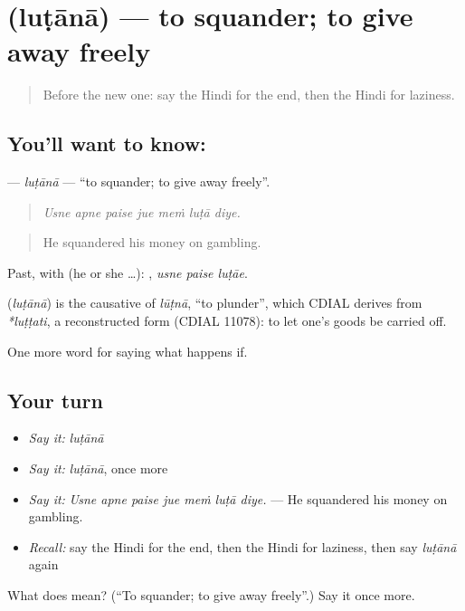 \section[\texorpdfstring{\hi{लुटाना} (luṭānā)}{लुटाना (luṭānā)}]{ (luṭānā) — to squander; to give away freely}

\label{lesson:HI-C548-lutana}



\begin{quote}
Before the new one: say the Hindi for the end, then the Hindi for laziness.
\end{quote}

\subsection*{You'll want to know: }
\textbf{} — \emph{luṭānā} — \textquotedblleft{}to squander; to give away freely\textquotedblright{}.

\begin{quote}
      
\end{quote}

\begin{quote}
\emph{Usne apne paise jue meṁ luṭā diye.}
\end{quote}

\begin{quote}
He squandered his money on gambling.
\end{quote}

Past, with  (he or she …):   , \emph{usne paise luṭāe}.

\begin{cousinweb}
\textbf{} (\emph{luṭānā}) is the causative of \emph{lūṭnā}, \textquotedblleft{}to plunder\textquotedblright{}, which CDIAL derives from \emph{*luṭṭati}, a reconstructed form (CDIAL 11078): to let one's goods be carried off.
\end{cousinweb}

\begin{grammarlens}[title={What you've built}]
One more word for saying what happens if.
\end{grammarlens}

\subsection*{Your turn}
\begin{itemize}
\raggedright
  \item \emph{Say it:} \emph{luṭānā}
  \item \emph{Say it:} \emph{luṭānā}, once more
  \item \emph{Say it:} \emph{Usne apne paise jue meṁ luṭā diye.} — He squandered his money on gambling.
  \item \emph{Recall:} say the Hindi for the end, then the Hindi for laziness, then say \emph{luṭānā} again
\end{itemize}

\begin{tcolorbox}[breakable,colback=teal!4,colframe=teal!35!black,title={Before you move on}]
What does  mean? (\textquotedblleft{}To squander; to give away freely\textquotedblright{}.) Say it once more.
\end{tcolorbox}
